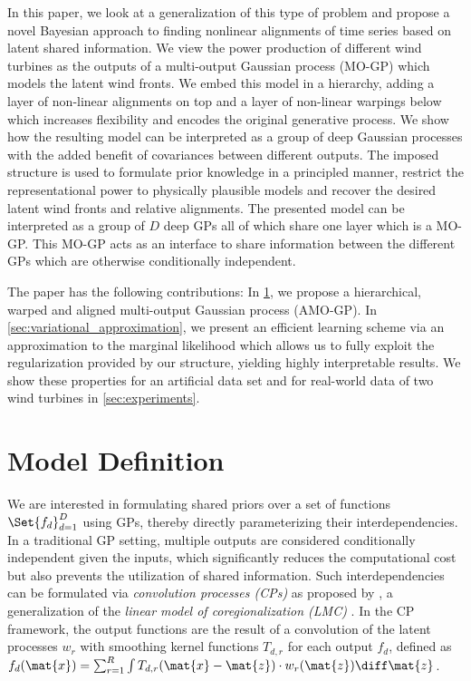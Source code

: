 \documentclass{article}
\begin{document}
In this paper, we look at a generalization of this type of problem and propose a novel Bayesian approach to finding nonlinear alignments of time series based on latent shared information.
We view the power production of different wind turbines as the outputs of a multi-output Gaussian process (MO-GP) \parencite{alvarez_kernels_2011} which models the latent wind fronts.
We embed this model in a hierarchy, adding a layer of non-linear alignments on top and a layer of non-linear warpings \parencites{NIPS2003_2481,lazaro-gredilla_bayesian_2012} below which increases flexibility and encodes the original generative process.
We show how the resulting model can be interpreted as a group of deep Gaussian processes with the added benefit of covariances between different outputs.
The imposed structure is used to formulate prior knowledge in a principled manner, restrict the representational power to physically plausible models and  recover the desired latent wind fronts and relative alignments.
The presented model can be interpreted as a group of $D$ deep GPs all of which share one layer which is a MO-GP.
This MO-GP acts as an interface to share information between the different GPs which are otherwise conditionally independent.

The paper has the following contributions:
In \cref{sec:model}, we propose a hierarchical, warped and aligned  multi-output Gaussian process (AMO-GP).
In \cref{sec:variational_approximation}, we present an efficient learning scheme via an approximation to the marginal likelihood which allows us to fully exploit the regularization provided by our structure, yielding highly interpretable results.
We show these properties for an artificial data set and for real-world data of two wind turbines in \cref{sec:experiments}.


\section{Model Definition}
\label{sec:model}
We are interested in formulating shared priors over a set of functions $\Set{f_d}_{d=1}^D$ using GPs, thereby directly parameterizing their interdependencies.
In a traditional GP setting, multiple outputs are considered conditionally independent given the inputs, which significantly reduces the computational cost but also prevents the utilization of shared information.
Such interdependencies can be formulated via \emph{convolution processes (CPs)} as proposed by \textcite{boyle_dependent_2004}, a generalization of the \emph{linear model of coregionalization (LMC)} \parencite{journel_mining_1978,coburn_geostatistics_2000}.
In the CP framework, the output functions are the result of a convolution of the latent processes $w_r$ with smoothing kernel functions $T_{d,r}$ for each output $f_d$, defined as $f_d(\mat{x}) = \sum_{r=1}^R \int T_{d,r}(\mat{x} - \mat{z}) \cdot w_r(\mat{z}) \diff \mat{z}$.
\end{document}
